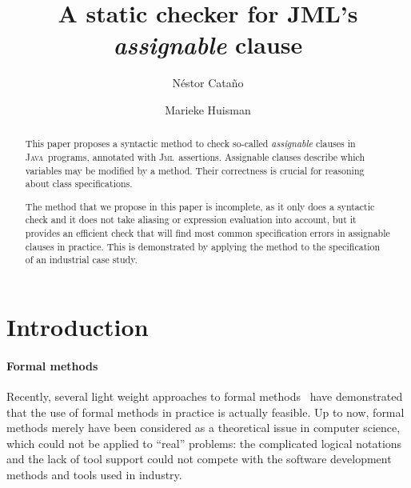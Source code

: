\documentclass[a4paper]{llncs}
\title{A static checker for JML's \emph{assignable} clause}
\author{
  N\'estor Cata\~no
\and
  Marieke Huisman
}
\institute{
  \inria\ Sophia-Antipolis, France \\ 
  \email{\{Nestor.Catano, Marieke.Huisman\}@sophia.inria.fr}
}
\newcommand{\jml}{\textsc{Jml}}
\newcommand{\java}{\textsc{Java}}
\newcommand{\gplus}{\textsc{GemPlus}}
\begin{document}
\fussy
\maketitle
\pagestyle{plain}

\begin{abstract}
This paper proposes a syntactic method to check so-called
\emph{assignable} clauses in \java\ programs, annotated with \jml\
assertions. Assignable clauses describe which variables may be
modified by a method. Their correctness is crucial for reasoning about 
class specifications. 

The method that we propose in this paper is incomplete, as it only
does a syntactic check and it does not take aliasing or expression evaluation
into account, but it provides an efficient check that will find most
common specification errors in assignable clauses in practice. This is 
demonstrated by applying the method to the specification of an
industrial case study.



\end{abstract}






\section{Introduction}
\label{sec-intro}

\paragraph{\bf Formal methods}

Recently, several light weight approaches to formal 
methods~\cite{LeinoNS00,CatanoH02a} have demonstrated that the use of
formal methods in practice is actually feasible.  Up to now, formal
methods merely have been considered as a theoretical issue in computer
science, which could not be applied to ``real'' problems: the
complicated logical notations and the lack of tool support could not
compete with the software development methods and tools used in
industry.
\end{document}
